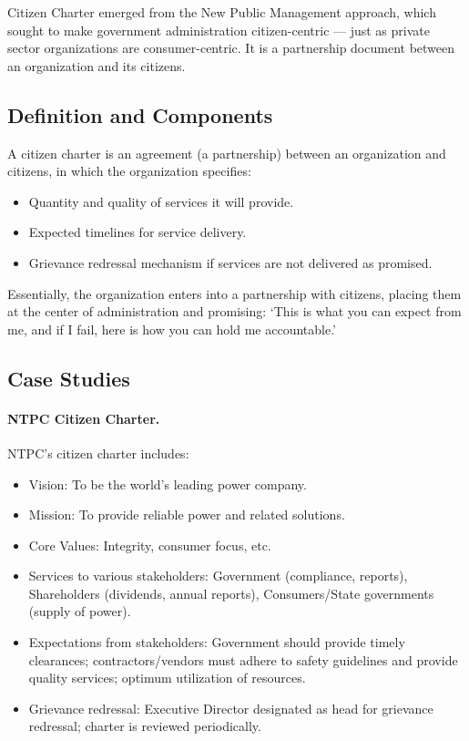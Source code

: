 \begin{KeyConcept}
Citizen Charter emerged from the New Public Management approach, which sought to make government administration citizen-centric --- just as private sector organizations are consumer-centric. It is a partnership document between an organization and its citizens.
\end{KeyConcept}

\subsection{Definition and Components}
A citizen charter is an agreement (a partnership) between an organization and citizens, in which the organization specifies:
\begin{itemize}
\item Quantity and quality of services it will provide.
\item Expected timelines for service delivery.
\item Grievance redressal mechanism if services are not delivered as promised.
\end{itemize}
Essentially, the organization enters into a partnership with citizens, placing them at the center of administration and promising: `This is what you can expect from me, and if I fail, here is how you can hold me accountable.'

\subsection{Case Studies}

\paragraph{NTPC Citizen Charter.} NTPC's citizen charter includes:
\begin{itemize}
\item Vision: To be the world's leading power company.
\item Mission: To provide reliable power and related solutions.
\item Core Values: Integrity, consumer focus, etc.
\item Services to various stakeholders: Government (compliance, reports), Shareholders (dividends, annual reports), Consumers/State governments (supply of power).
\item Expectations from stakeholders: Government should provide timely clearances; contractors/vendors must adhere to safety guidelines and provide quality services; optimum utilization of resources.
\item Grievance redressal: Executive Director designated as head for grievance redressal; charter is reviewed periodically.
\end{itemize}

